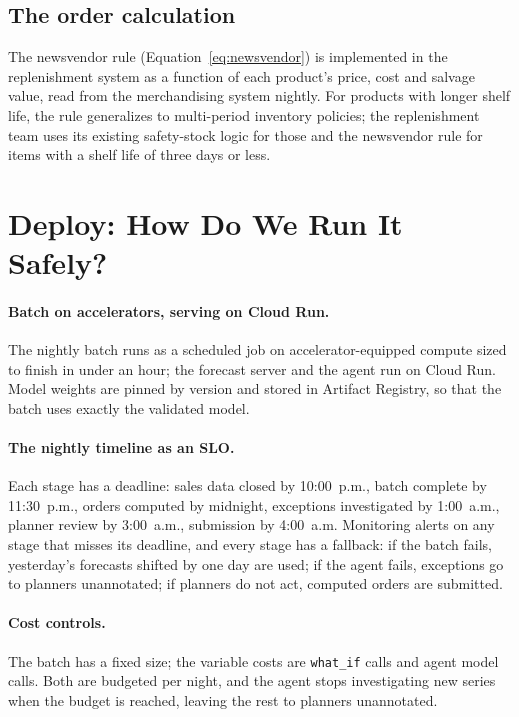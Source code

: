 \subsection{The order calculation}

The newsvendor rule (Equation~\eqref{eq:newsvendor}) is implemented in the replenishment system as a function of each product's price, cost and salvage value, read from the merchandising system nightly. For products with longer shelf life, the rule generalizes to multi-period inventory policies; the replenishment team uses its existing safety-stock logic for those and the newsvendor rule for items with a shelf life of three days or less.

\section{Deploy: How Do We Run It Safely?}
\label{sec:fc-deploy}

\paragraph{Batch on accelerators, serving on Cloud Run.} The nightly batch runs as a scheduled job on accelerator-equipped compute sized to finish in under an hour; the forecast server and the agent run on Cloud Run. Model weights are pinned by version and stored in Artifact Registry, so that the batch uses exactly the validated model.

\paragraph{The nightly timeline as an SLO.} Each stage has a deadline: sales data closed by 10:00~p.m., batch complete by 11:30~p.m., orders computed by midnight, exceptions investigated by 1:00~a.m., planner review by 3:00~a.m., submission by 4:00~a.m. Monitoring alerts on any stage that misses its deadline, and every stage has a fallback: if the batch fails, yesterday's forecasts shifted by one day are used; if the agent fails, exceptions go to planners unannotated; if planners do not act, computed orders are submitted.

\paragraph{Cost controls.} The batch has a fixed size; the variable costs are \texttt{what\_if} calls and agent model calls. Both are budgeted per night, and the agent stops investigating new series when the budget is reached, leaving the rest to planners unannotated.

